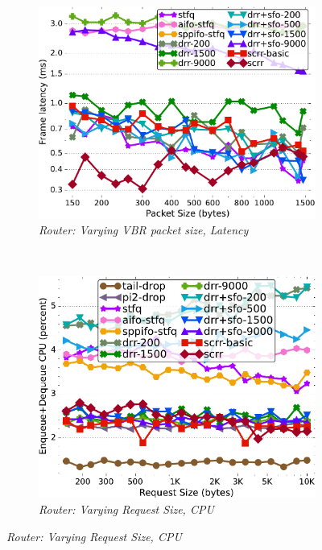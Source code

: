 \begin{figure}[th!]
  \begin{subfigure}[t]{.30\linewidth}
    \centering
    \includegraphics[width=0.95\linewidth]{figs/pkt_size_cn_2t4x16_mn_2ui32_bbr3_lat_comp_drr_scrr.pdf}
    \caption{\small{\textit{Router: Varying VBR packet size, Latency}}}
    \label{fig:vbr-bbr3-latency-sched-full}
  \end{subfigure}
  \\
  \begin{subfigure}[t]{.30\linewidth}
    \centering
    \includegraphics[width=0.95\linewidth]{figs/pkt_size_cn_2t4x16_mn_2tb2x4_bbr3_kp_comp_methods.pdf}
    \caption{\small{\textit{Router: Varying Request Size, CPU}}}
    \label{fig:request-bbr3-cpu-full}
  \end{subfigure}

\end{figure}
